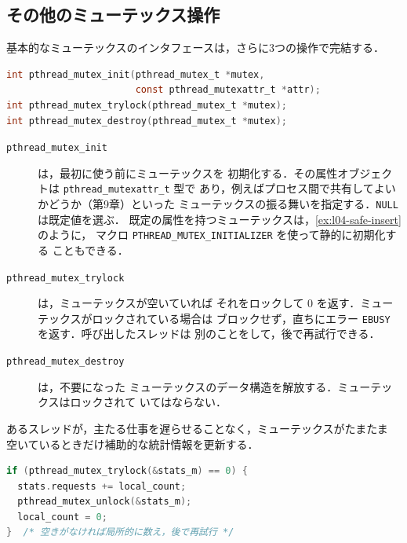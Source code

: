 \documentclass[../main.tex]{subfiles}
\begin{document}
\subsection{その他のミューテックス操作}

基本的なミューテックスのインタフェースは，さらに3つの操作で完結する．%
\begin{lstlisting}[language=C, numbers=none]
int pthread_mutex_init(pthread_mutex_t *mutex,
                       const pthread_mutexattr_t *attr);
int pthread_mutex_trylock(pthread_mutex_t *mutex);
int pthread_mutex_destroy(pthread_mutex_t *mutex);
\end{lstlisting}
\begin{description}
  \item[\texttt{pthread\_mutex\_init}] は，最初に使う前にミューテックスを
    初期化する．その属性オブジェクトは \texttt{pthread\_mutexattr\_t} 型で
    あり，例えばプロセス間で共有してよいかどうか（第9章）といった
    ミューテックスの振る舞いを指定する．\texttt{NULL} は既定値を選ぶ．%
    既定の属性を持つミューテックスは，\cref{ex:l04-safe-insert} のように，
    マクロ \texttt{PTHREAD\_MUTEX\_INITIALIZER} を使って静的に初期化する
    こともできる．
  \item[\texttt{pthread\_mutex\_trylock}] は，ミューテックスが空いていれば
    それをロックして 0 を返す．ミューテックスがロックされている場合は
    ブロックせず，直ちにエラー \texttt{EBUSY} を返す．呼び出したスレッドは
    別のことをして，後で再試行できる．%
  \item[\texttt{pthread\_mutex\_destroy}] は，不要になった
    ミューテックスのデータ構造を解放する．ミューテックスはロックされて
    いてはならない．
\end{description}

\begin{example}
  あるスレッドが，主たる仕事を遅らせることなく，ミューテックスがたまたま
  空いているときだけ補助的な統計情報を更新する．
  \begin{lstlisting}[language=C, numbers=none]
if (pthread_mutex_trylock(&stats_m) == 0) {
  stats.requests += local_count;
  pthread_mutex_unlock(&stats_m);
  local_count = 0;
}  /* 空きがなければ局所的に数え，後で再試行 */
\end{lstlisting}
\end{example}
\end{document}
